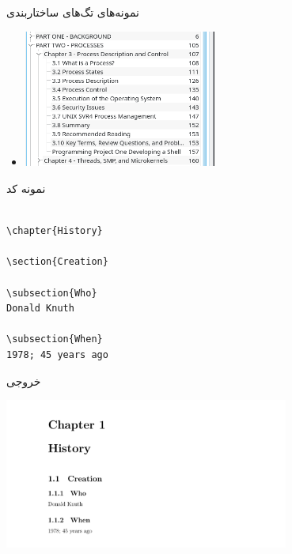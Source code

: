 \begin{frame}{نمونه‌های تگ‌های ساختاربندی}
\begin{itemize}\itemr
\item[]
\begin{center}
\includegraphics[width=0.5\textwidth, height=0.6\textheight]{docs/images/secexample}
\end{center}
\end{itemize}
\end{frame}

\begin{frame}[fragile]{نمونه کد}
\begin{latin}
\begin{lstlisting}[keywords={part, chapter, section, subsection}, keywordstyle=\color{Mulberry}\textbf]

\chapter{History}

\section{Creation}

\subsection{Who}
Donald Knuth

\subsection{When}
1978; 45 years ago

\end{lstlisting}
\end{latin}
\end{frame}

\begin{frame}{خروجی}
\begin{center}
\includegraphics[width=0.7\textwidth, height=0.6\textheight]{docs/images/chsec}
\end{center}
\end{frame}

